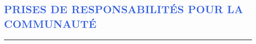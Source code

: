 \documentclass[11pt, a4paper, french]{article}
\begin{document}


\lfoot{}


\vspace{-0.3cm}
\textcolor{RoyalBlue}{\section{\large PRISES DE RESPONSABILITÉS POUR LA COMMUNAUTÉ}
\vspace{-0.2cm}\hrule}
\vspace{0.4cm}
\end{document}
